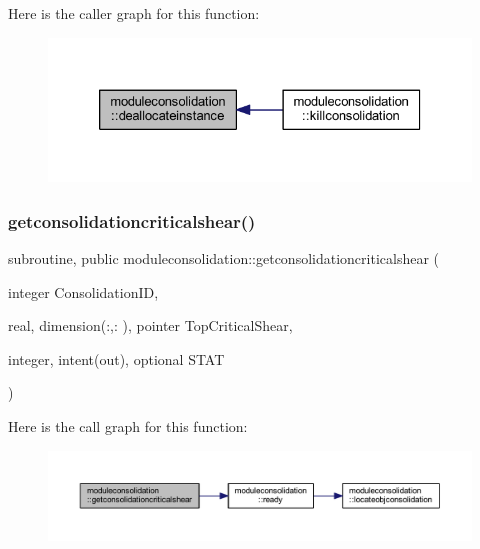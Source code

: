 Here is the caller graph for this function\+:\nopagebreak
\begin{figure}[H]
\begin{center}
\leavevmode
\includegraphics[width=326pt]{namespacemoduleconsolidation_ac59ee6a9bf70ef4f2f509cc55bb5b242_icgraph}
\end{center}
\end{figure}
\mbox{\label{namespacemoduleconsolidation_a9ca5460ab4ca639ac19eb7de5aea9bf6}} 
\subsubsection{\texorpdfstring{getconsolidationcriticalshear()}{getconsolidationcriticalshear()}}
{\footnotesize\ttfamily subroutine, public moduleconsolidation\+::getconsolidationcriticalshear (\begin{DoxyParamCaption}\item[{integer}]{Consolidation\+ID,  }\item[{real, dimension(\+:,\+:  ), pointer}]{Top\+Critical\+Shear,  }\item[{integer, intent(out), optional}]{S\+T\+AT }\end{DoxyParamCaption})}

Here is the call graph for this function\+:\nopagebreak
\begin{figure}[H]
\begin{center}
\leavevmode
\includegraphics[width=350pt]{namespacemoduleconsolidation_a9ca5460ab4ca639ac19eb7de5aea9bf6_cgraph}
\end{center}
\end{figure}
\mbox{\label{namespacemoduleconsolidation_a7d4c44834bf2eef5548235e522170c91}} 
